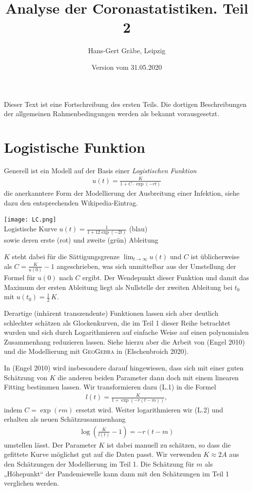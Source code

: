 \documentclass[a4paper,11pt]{article}
\title{Analyse der Coronastatistiken. Teil 2}
\author{Hans-Gert Gräbe, Leipzig}
\date{Version vom 31.05.2020}
\newcommand{\br}[1]{\left(#1\right)}
\newcommand{\m}{\cdot}
\begin{document}
\maketitle

Dieser Text ist eine Fortschreibung des ersten Teils. Die dortigen
Beschreibungen der allgemeinen Rahmenbedingungen werden als bekannt
vorausgesetzt. 

\section{Logistische Funktion}

Generell ist ein Modell auf der Basis einer \emph{Logistischen Funktion}
\begin{gather*}
  u(t)=\frac{K}{1+C\m\exp(-rt)}\tag{L.1}
\end{gather*}
die anerkanntere Form der Modellierung der Ausbreitung einer Infektion, siehe
dazu den entsprechenden Wikipedia-Eintrag. 
\begin{center}
  \texttt{[image: LC.png]}\\[1em] {Logistische Kurve
    $u(t)=\frac{1}{1+12\exp(-2t)}$ (blau)\\ sowie deren erste (rot) und zweite
    (grün) Ableitung}
\end{center}
$K$ steht dabei für die Sättigungsgrenze $\lim_{t\to\infty}{u(t)}$ und $C$ ist
üblicherweise als $C=\frac{K}{u(0)}-1$ angeschrieben, was sich unmittelbar aus
der Umstellung der Formel für $u(0)$ nach $C$ ergibt. Der Wendepunkt dieser
Funktion und damit das Maximum der ersten Ableitung liegt als Nullstelle der
zweiten Ableitung bei $t_0$ mit $u(t_0)=\frac12\,K$. 

Derartige (inhärent transzendente) Funktionen lassen sich aber deutlich
schlechter schätzen als Glockenkurven, die im Teil 1 dieser Reihe betrachtet
wurden und sich durch Logarithmieren auf einfache Weise auf einen polynomialen
Zusammenhang reduzieren lassen.  Siehe hierzu aber die Arbeit von (Engel 2010)
und die Modellierung mit \textsc{GeoGebra} in (Elschenbroich 2020).

In (Engel 2010) wird insbesondere darauf hingewiesen, dass sich mit einer
guten Schätzung von $K$ die anderen beiden Parameter dann doch mit einem
linearen Fitting bestimmen lassen.  Wir transformieren dazu (L.1) in die
Formel 
\begin{gather*}
  l(t)=\frac{K}{1+\exp(-r(t-m))},\tag{L.2}
\end{gather*}
indem $C=\exp(r m)$ ersetzt wird.  Weiter logarithmieren wir (L.2) und
erhalten als neuen Schätzzusammenhang
\begin{gather*}
  \log\br{\frac{K}{l(t)}-1}=-r(t-m)  \tag{L.3}
\end{gather*}
umstellen lässt.  Der Parameter $K$ ist dabei manuell zu schätzen, so dass die
gefittete Kurve möglichst gut auf die Daten passt.  Wir verwenden $K\approx
2A$ aus den Schätzungen der Modellierung im Teil 1.  Die Schätzung für $m$ als
„Höhepunkt“ der Pandemiewelle kann dann mit den Schätzungen im Teil 1
verglichen werden.
\end{document}
